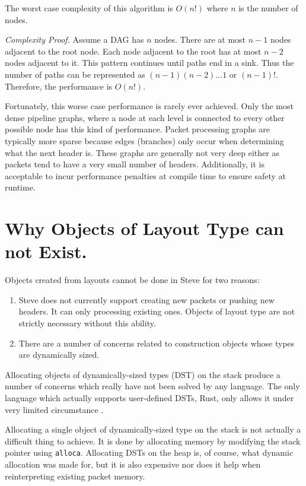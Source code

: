 The worst case complexity of this algorithm is $O(n!)$ where $n$ is the number of nodes.

\textit{Complexity Proof.} Assume a DAG has $n$ nodes. There are at most $n-1$ nodes adjacent to the root node. Each node adjacent to the root has at most $n-2$ nodes adjacent to it. This pattern continues until paths end in a sink. Thus the number of paths can be represented as $(n-1)(n-2)...1$ or $(n-1)!$. Therefore, the performance
is $O(n!)$.

Fortunately, this worse case performance is rarely ever achieved. Only the most dense pipeline graphs, where a node at each level is connected to every other possible node has this kind of performance. Packet processing graphs are typically more sparse because edges (branches) only occur when determining what the next header is. These graphs are generally not very deep either as packets tend to have a very small number of headers.
Additionally, it is acceptable to incur performance penalties at compile time
to ensure safety at runtime.

\section{Why Objects of Layout Type can not Exist.} \label{guide:no_dst}

Objects created from layouts cannot be done in Steve for two reasons:

\begin{enumerate}
\item Steve does not currently support creating new packets or pushing new headers. 
It can only processing existing ones. 
Objects of layout type are not strictly necessary without this ability.

\item There are a number of concerns related to construction objects whose
types are dynamically sized.
\end{enumerate}

Allocating objects of dynamically-sized types (DST) on the stack produce a number of concerns which really have not been solved by any language.
The only language which actually supports user-defined DSTs, Rust, only allows it under 
very limited circumstance \cite{rust_dst_std}.

Allocating a single object of dynamically-sized type on the stack is not actually a difficult thing to achieve. 
It is done by allocating memory by modifying the stack pointer using
\texttt{alloca}. 
Allocating DSTs on the heap is, of course, what dynamic allocation was made for, but
it is also expensive nor does it help when reinterpreting existing packet memory.

